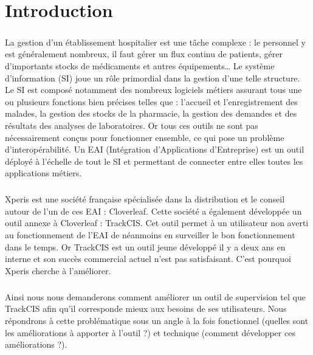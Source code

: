 \chapter*{Introduction}
	\paragraph{}
	La gestion d'un établissement hospitalier est une tâche complexe :
	le personnel y est généralement nombreux, il faut gérer un flux continu de
	patients, gérer d'importants stocks de médicaments et autres équipements\ldots
	Le système d'information (SI) joue un rôle primordial dans la gestion d'une
	telle structure. Le SI est composé notamment des nombreux logiciels métiers
	assurant tous une ou plusieurs fonctions bien précises telles que : l'accueil
	et l'enregistrement des malades, la gestion des stocks de la pharmacie, la gestion
	des demandes et des résultats des analyses de laboratoires. Or tous ces
	outils ne sont pas nécessairement conçus pour fonctionner ensemble, ce qui
	pose un problème d'interopérabilité. Un EAI (Intégration d'Applications d'Entreprise)
	est un outil déployé à l'échelle de tout le SI et permettant de connecter
	entre elles toutes les applications métiers.
	
	\paragraph{}
	Xperis est une société française spécialisée dans la distribution et le conseil
	autour de l'un de ces EAI : Cloverleaf. Cette société a également développée
	un outil annexe à Cloverleaf : TrackCIS. Cet outil permet à un utilisateur non
	averti au fonctionnement de l'EAI de néanmoins en surveiller le bon
	fonctionnement dans le temps. Or TrackCIS est un outil jeune développé il y a
	deux ans en interne et son succès commercial actuel n'est pas satisfaisant.
	C'est pourquoi Xperis cherche à l'améliorer.
	
	\paragraph{}
	Ainsi nous nous demanderons comment améliorer un outil de supervision tel que
	TrackCIS afin qu'il corresponde mieux aux besoins de ses utilisateurs.\newline
	Nous répondrons à cette problématique sous un angle à la fois fonctionnel
	(quelles sont les améliorations à apporter à l'outil ?) et technique (comment
	développer ces améliorations ?).
	
